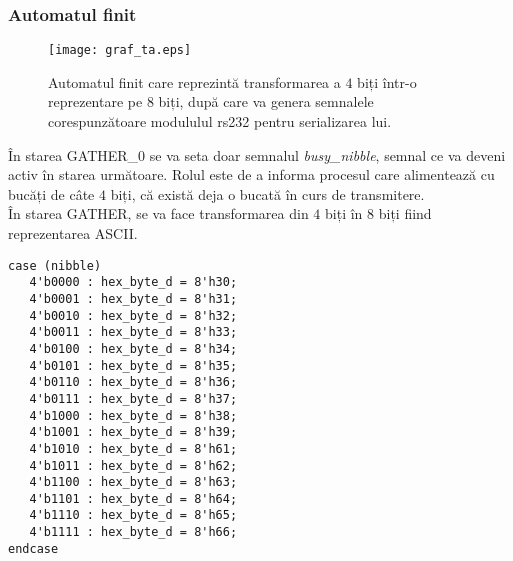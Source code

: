\documentclass[12pt,twoside,a4paper,fleqn]{book}
\theoremstyle{definition}
\begin{document}
\subsubsection{Automatul finit}
\begin{figure}[h]
\texttt{[image: graf\_ta.eps]}
\caption{\small{Automatul finit care reprezintă transformarea a $4$ biți într-o reprezentare pe $8$ biți, după care va genera semnalele corespunzătoare modululul rs232 pentru serializarea lui.}}
\label{fig:fig_aut1}
\end{figure}

În starea GATHER\_0 se va seta doar semnalul \emph{busy\_nibble}, semnal ce va deveni activ în starea următoare. Rolul este de a informa procesul care alimentează cu bucăți de câte $4$ biți, că există deja o bucată în curs de transmitere.\\
În starea GATHER, se va face transformarea din $4$ biți în $8$ biți fiind reprezentarea ASCII.

\begin{fragmentsursa}
\begin{scriptsize}
\begin{verbatim}
case (nibble)
   4'b0000 : hex_byte_d = 8'h30;
   4'b0001 : hex_byte_d = 8'h31;
   4'b0010 : hex_byte_d = 8'h32;
   4'b0011 : hex_byte_d = 8'h33;
   4'b0100 : hex_byte_d = 8'h34;
   4'b0101 : hex_byte_d = 8'h35;
   4'b0110 : hex_byte_d = 8'h36;
   4'b0111 : hex_byte_d = 8'h37;
   4'b1000 : hex_byte_d = 8'h38;
   4'b1001 : hex_byte_d = 8'h39;
   4'b1010 : hex_byte_d = 8'h61;
   4'b1011 : hex_byte_d = 8'h62;
   4'b1100 : hex_byte_d = 8'h63;
   4'b1101 : hex_byte_d = 8'h64;
   4'b1110 : hex_byte_d = 8'h65;
   4'b1111 : hex_byte_d = 8'h66;
endcase
\end{verbatim}
\end{scriptsize}
\caption{Translatarea din binar ($4$ biți), în ASCII ($8$ biți).}
\label{ta_frag1}
\end{fragmentsursa}
\end{document}
